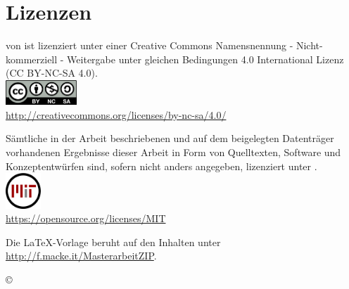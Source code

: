 \chapter*{Lizenzen}

\begin{center}

\vspace*{\fill}

\quotes{\thema} von \autor\space ist lizenziert unter einer Creative Commons Namensnennung - Nicht-kommerziell - Weitergabe unter gleichen Bedingungen 4.0 International Lizenz (CC BY-NC-SA 4.0). \\
\includegraphics[width=0.2\textwidth]{Bilder/by-nc-sa-eu}\\
\url{http://creativecommons.org/licenses/by-nc-sa/4.0/}

\bigskip\bigskip\bigskip\bigskip



Sämtliche in der Arbeit beschriebenen und auf dem beigelegten Datenträger
vorhandenen Ergebnisse dieser Arbeit in Form von Quelltexten, Software und
Konzeptentwürfen sind, sofern nicht anders angegeben, lizenziert unter . \\
\includegraphics[width=0.1\textwidth]{Bilder/mit_license}\\
\url{https://opensource.org/licenses/MIT}

\bigskip\bigskip\bigskip\bigskip

Die LaTeX-Vorlage beruht auf den Inhalten unter\\
\url{http://f.macke.it/MasterarbeitZIP}.

\bigskip\bigskip\bigskip\bigskip

{\large \copyright {} \space \autor}

\vspace*{\fill}

\end{center}

